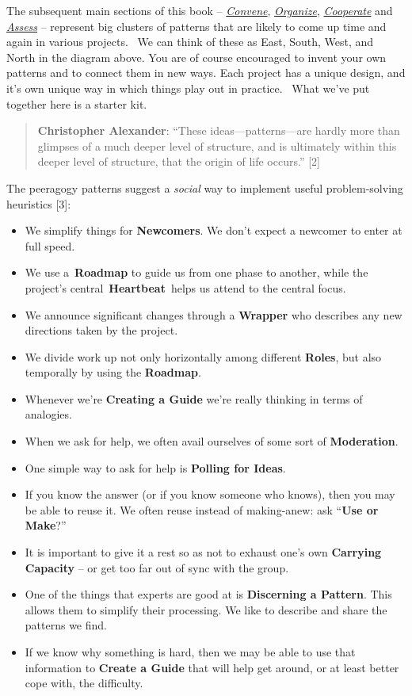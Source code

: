 The subsequent main sections of this book --
\href{http://peeragogy.org/convene/}{\emph{Convene}},
\href{http://peeragogy.org/organize/}{\emph{Organize}},
\href{http://peeragogy.org/facilitate/}{\emph{Cooperate}} and
\href{http://peeragogy.org/assessment/}{\emph{Assess}} -- represent big
clusters of patterns that are likely to come up time and again in
various projects.~ We can think of these as East, South, West, and North
in the diagram above. You are of course encouraged to invent your own
patterns and to connect them in new ways. Each project has a unique
design, and it's own unique way in which things play out in practice.~
What we've put together here is a starter kit.

\begin{quote}
\textbf{Christopher Alexander}: ``These ideas---patterns---are hardly more
than glimpses of a much deeper level of structure, and is ultimately
within this deeper level of structure, that the origin of life occurs.''
{[}2{]}
\end{quote}

\noindent The peeragogy patterns suggest a \emph{social} way to implement useful problem-solving heuristics [3]:

\begin{itemize}
\itemsep1pt\parskip0pt
\item
  We simplify things for \textbf{Newcomers}. We don't expect a newcomer to
  enter at full speed.
\item
  We use a~\textbf{Roadmap} to guide us from one phase to another, while
  the project's central~\textbf{Heartbeat}~helps us attend to the
  central focus.
\item
  We announce significant changes through a \textbf{Wrapper} who
  describes any new directions taken by the project.
\item
  We divide work up not only horizontally among different
  \textbf{Roles}, but also temporally by using the \textbf{Roadmap}.
\item
  Whenever we're \textbf{Creating a Guide}
  we're really thinking in terms of analogies.
\item
  When we ask for help, we often avail ourselves of some sort of
  \textbf{Moderation}.
\item One simple way to ask for help is \textbf{Polling for Ideas}.
\item
  If you know the answer (or if you know someone who knows), then you may be able to reuse it.  We often reuse instead of making-anew: ask ``\textbf{Use or Make}?''
\item
  It is important to give it a rest so as not to exhaust one's own
  \textbf{Carrying Capacity} -- or get too far out of sync with the
  group.
\item One of the things that experts are good at is \textbf{Discerning
  a Pattern}. This allows them to simplify their processing.  We like to describe and share the patterns we find.
\item If we know why something is hard, then we may be able to use
  that information to \textbf{Create a Guide} that will help get
  around, or at least better cope with, the difficulty.
\end{itemize}

